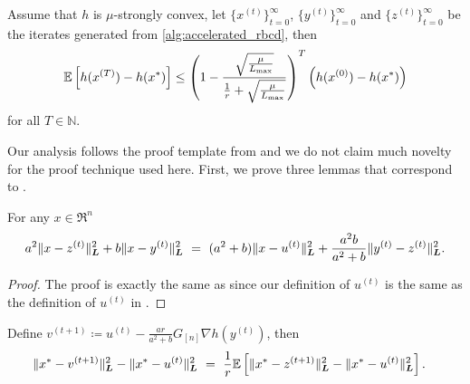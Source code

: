 \begin{theorem} \label{thm:accelerated_rbcd}
    Assume that $h$ is $\mu$-strongly convex, let $\{x^{(t)}\}_{t=0}^\infty$, $\{y^{(t)}\}_{t=0}^\infty$ and $\{z^{(t)}\}_{t=0}^\infty$ be the iterates generated from \autoref{alg:accelerated_rbcd}, then
    \begin{align*}
        \mathbb{E} \left[ h( x^{(T)} ) - h(x^*) \right] \leq \left( 1 - \frac{ \sqrt{\frac{\mu}{L_{\max}}}}{ \frac{1}{r} + \sqrt{\frac{\mu}{L_{\max}}} } \right)^T \left( h(x^{(0)}) - h(x^*) \right)
    \end{align*}
    for all $T \in \mathbb{N}$.
\end{theorem}

Our analysis follows the proof template from \citet{Lu18} and we do not claim much novelty for the proof technique used here. First, we prove three lemmas that correspond to \citep[Lemma~A.1, Lemma~A.2, Lemma~A.3]{Lu18}.

\begin{lemma} \label{lemma:Lu18A1}
    For any $x\in\Re^n$
    \[a^2 \| x - z^{(t)} \|^2_{\boldsymbol{L}} + b  \| x - y^{(t)} \|^2_{\boldsymbol{L}} ~=~ (a^2 + b) \| x - u^{(t)} \|^2_{\boldsymbol{L}} + \frac{a^2b}{a^2+b} \| y^{(t)} - z^{(t)} \|^2_{\boldsymbol{L}}.\]
\end{lemma}
\begin{proof}
     The proof is exactly the same as \cite[Lemma~A.1]{Lu18} since our definition of $u^{(t)}$ is the same as the definition of $u^{(t)}$ in \cite[Algorithm~2]{Lu18}.
\end{proof}

\begin{lemma} \label{lemma:Lu18A2}
    Define $v^{(t+1)} \coloneqq u^{(t)} - \frac{ar}{a^2 + b} G_{[n]} \nabla h(y^{(t)})$, then
    \begin{align*}
        \| x^* - v^{(t+1)} \|^2_{\boldsymbol{L}} - \| x^* - u^{(t)} \|^2_{\boldsymbol{L}} &~=~ \frac{1}{r} \mathbb{E} \left[ \| x^* - z^{(t+1)} \|^2_{\boldsymbol{L}} - \| x^* - u^{(t)} \|^2_{\boldsymbol{L}} \right]. 
    \end{align*}
\end{lemma}

